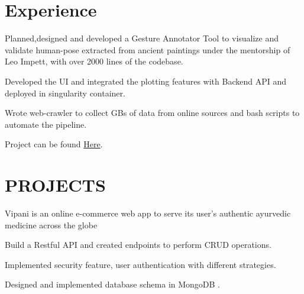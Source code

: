 \documentclass[]{deedy-resume-openfont}
\begin{document}
\begin{minipage}[t]{0.66\textwidth} 


\section{Experience}

\vspace{\topsep} %
\begin{tightemize}\item Planned,designed and developed a Gesture Annotator Tool to visualize and
validate human-pose extracted from ancient paintings under the mentorship of Leo Impett, with over 2000 lines of the codebase.
\item Developed the UI and integrated the plotting features with Backend API and deployed in singularity container.
\item Wrote web-crawler to collect GBs of data from online sources and bash scripts
to automate the pipeline.
\item Project can be found  \href{https://summerofcode.withgoogle.com/archive/2019/projects/5565179075493888/}{Here}.
\end{tightemize}
\sectionsep

\sectionsep


\section{PROJECTS}
Vipani is an online e-commerce web app to serve its user’s authentic ayurvedic
medicine across the globe
\begin{tightemize}
\item Build a Restful API and created endpoints to perform CRUD operations.
\item Implemented security feature, user authentication with different strategies.
\item Designed and implemented database schema in MongoDB .
\end{tightemize}
\sectionsep


\end{minipage}
\end{document}
